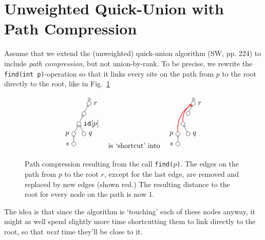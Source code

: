 \documentclass{tstextbook}
\begin{document}
\section{Unweighted Quick-Union with Path Compression}

Assume that we extend the (unweighted) quick-union algorithm (SW, pp. 224) to include \emph{path compression}, but not  union-by-rank.
To be precise, we rewrite the \texttt{find(int p)}-operation so that it links every site on the path from $p$ to the root directly to the root, like in Fig.~\ref{fig: path compression}

\begin{figure}[h]
  \[
  \begin{tikzpicture}[scale = .5]
  \node (p)    at (0,0) [circle, draw, inner sep = 2pt, label = left:$p$] {};
    \node (idp)  at (.5,1) [circle, draw, inner sep = 2pt, label = right:{$\mathtt{id}[p]$}] {};
  \node (dots) at (1,2) [circle, draw, inner sep = 2pt] {};
  \node (r)    at (1.5,3) [circle, draw, inner sep = 2pt, label = right:$r$] {};
    \node (q) at (1,0) [circle, draw, inner sep = 2pt, label = right:$q$] {};
    \node (s) at (0, -1) [circle, draw, inner sep = 2pt, label = left:$s$] {};
  \draw [->] (p) -- (idp);
  \draw [->] (q) -- (idp);
  \draw [->] (idp) -- (dots);
  \draw [->] (dots) -- (r);
    \draw[->] (s) -- (p);
  \path [->] (r) edge [loop above] (r);
\end{tikzpicture}
\quad
\text{is `shortcut' into}
\quad
  \begin{tikzpicture}[scale = .5]
  \node (p)    at (0,0) [circle, draw, inner sep = 2pt, label = left:$p$] {};
  \node (idp)  at (0.5,1) [circle, draw, inner sep = 2pt] {};
    \node (dots) at (1,2) [circle, draw, inner sep = 2pt] {};
  \node (r)    at (1.5,3) [circle, draw, inner sep = 2pt, label = right:$r$] {};
    \node (q) at (1,0) [circle, draw, inner sep = 2pt, label = right:$q$] {};
    \node (s) at (0, -1) [circle, draw, inner sep = 2pt, label = left:$s$] {};
    \path [->,thick, red] (p) edge[bend left] (r);
    \path [->,thick, red] (idp) edge[bend left] (r);
  \draw [->] (dots) -- (r);
  \path [->] (r) edge [loop above] (r);
  \draw [->] (q) -- (idp);
    \draw[->] (s) -- (p);
\end{tikzpicture}
\]
  \caption{\label{fig: path compression}
  Path compression resulting from the call \texttt{find($p$)}.
  The edges on the path from $p$ to the root $r$, except for the last edge, are removed and replaced by new edges (shown red.)
  The resulting distance to the root for every node on the path is now $1$.
  }
\end{figure}
The idea is that since the algorithm is `touching' each of these nodes anyway, it might as well spend slightly more time shortcutting them to link directly to the root, so that \emph{next} time they'll be close to it.
\end{document}
